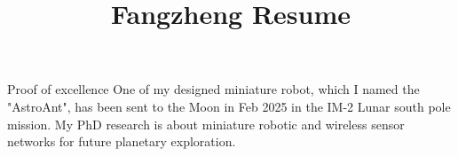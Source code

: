 \documentclass{resume} %
\begin{document}
\title{Fangzheng Resume}

\begin{rSection}{Proof of excellence}
      One of my designed miniature robot, which I named the "AstroAnt",
      has been sent to the Moon in Feb 2025 in the IM-2 Lunar south pole mission.
      My PhD research is about miniature robotic and wireless sensor networks for future planetary exploration.
\end{rSection}
\end{document}
